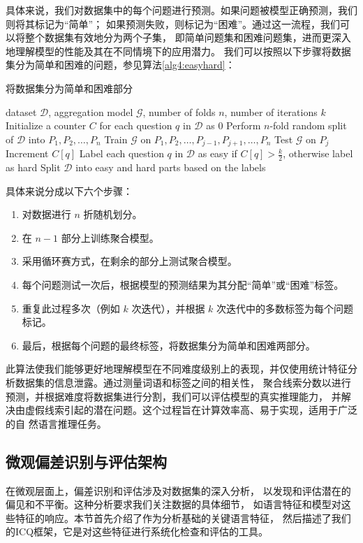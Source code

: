 具体来说，我们对数据集中的每个问题进行预测。如果问题被模型正确预测，我们则将其标记为``简单''；
如果预测失败，则标记为``困难''。通过这一流程，我们可以将整个数据集有效地分为两个子集，
即简单问题集和困难问题集，进而更深入地理解模型的性能及其在不同情境下的应用潜力。
我们可以按照以下步骤将数据集分为简单和困难的问题，参见算法\ref{alg4:easyhard}：
\begin{algorithm}[H]
    \caption{将数据集分为简单和困难部分}
    \label{alg4:easyhard}
    \begin{algorithmic}[1]
    \Require dataset $\mathcal{D}$, aggregation model $\mathcal{G}$, number of folds $n$, number of iterations $k$
    \State Initialize a counter $C$ for each question $q$ in $\mathcal{D}$ as 0
    \State Perform $n$-fold random split of $\mathcal{D}$ into ${P_1, P_2, \dots, P_n}$
    \State Train $\mathcal{G}$ on ${P_1, P_2, \dots, P_{j-1}, P_{j+1}, \dots, P_n}$
    \State Test $\mathcal{G}$ on $P_j$
    \State Increment $C[q]$
    \EndIf
    \EndFor
    \EndFor
    \EndFor
    \State Label each question $q$ in $\mathcal{D}$ as easy if $C[q] > \frac{k}{2}$, otherwise label as hard
    \State Split $\mathcal{D}$ into easy and hard parts based on the labels
    \end{algorithmic}
    \end{algorithm}
具体来说分成以下六个步骤：
\begin{enumerate}
\item 对数据进行 \(n\) 折随机划分。
\item 在 \(n-1\) 部分上训练聚合模型。
\item 采用循环赛方式，在剩余的部分上测试聚合模型。
\item 每个问题测试一次后，根据模型的预测结果为其分配``简单''或``困难''标签。
\item 重复此过程多次（例如 \(k\) 次迭代），并根据 \(k\) 次迭代中的多数标签为每个问题标记。
\item 最后，根据每个问题的最终标签，将数据集分为简单和困难两部分。
\end{enumerate}
此算法使我们能够更好地理解模型在不同难度级别上的表现，并仅使用统计特征分析数据集的信息泄露。通过测量词语和标签之间的相关性，
聚合线索分数以进行预测，并根据难度将数据集进行分割，我们可以评估模型的真实推理能力，
并解决由虚假线索引起的潜在问题。这个过程旨在计算效率高、易于实现，适用于广泛的自
然语言推理任务。

\subsection{微观偏差识别与评估架构}
\label{sec4:approach2}
在微观层面上，偏差识别和评估涉及对数据集的深入分析，
以发现和评估潜在的偏见和不平衡。这种分析要求我们关注数据的具体细节，
如语言特征和模型对这些特征的响应。本节首先介绍了作为分析基础的关键语言特征，
然后描述了我们的ICQ框架，它是对这些特征进行系统化检查和评估的工具。
